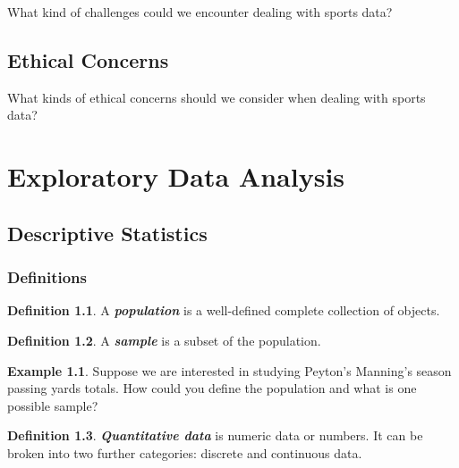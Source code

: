 \documentclass[
  11pt,
]{book}
\theoremstyle{definition}
\newtheorem{definition}{Definition}[chapter]
\theoremstyle{definition}
\newtheorem{example}{Example}[chapter]
\theoremstyle{definition}
\theoremstyle{definition}
\theoremstyle{remark}
\begin{document}
What kind of challenges could we encounter dealing with sports data?

\vfill

\hypertarget{ethical-concerns}{%
\section*{Ethical Concerns}\label{ethical-concerns}}

What kinds of ethical concerns should we consider when dealing with sports data?

\vfill

\hypertarget{exploratory-data-analysis}{%
\chapter{Exploratory Data Analysis}\label{exploratory-data-analysis}}

\hypertarget{descriptive-statistics}{%
\section{Descriptive Statistics}\label{descriptive-statistics}}

\hypertarget{definitions}{%
\subsection{Definitions}\label{definitions}}

\begin{definition}
A \textbf{\emph{population}} is a well-defined complete collection of objects.
\end{definition}

\begin{definition}
A \textbf{\emph{sample}} is a subset of the population.
\end{definition}

\begin{example}
Suppose we are interested in studying Peyton's Manning's season passing yards totals. How could you define the population and what is one possible sample?
\end{example}

\vfill

\begin{definition}
\textbf{\emph{Quantitative data}} is numeric data or numbers. It can be broken into two further categories: discrete and continuous data.
\end{definition}
\end{document}
